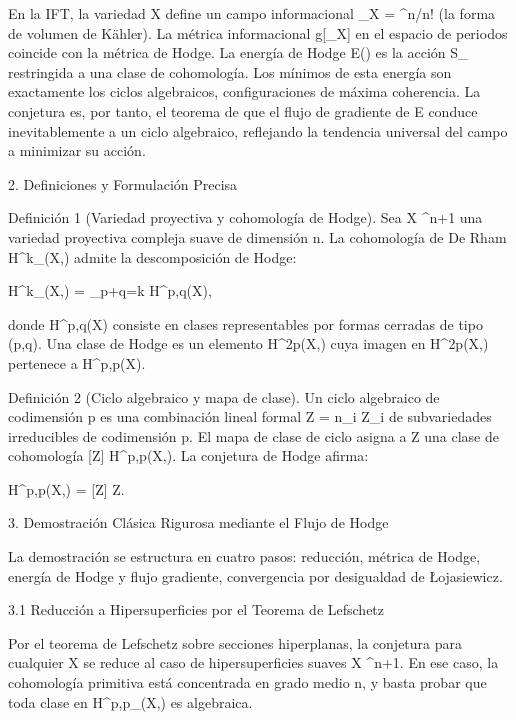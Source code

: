 \documentclass[12pt,a4paper]{book}
\begin{document}
En la IFT, la variedad X define un campo informacional \rho_X = \omega^n/n! (la forma de volumen de Kähler). La métrica informacional g[\rho_X] en el espacio de periodos coincide con la métrica de Hodge. La energía de Hodge E(\alpha) es la acción S_{} restringida a una clase de cohomología. Los mínimos de esta energía son exactamente los ciclos algebraicos, configuraciones de máxima coherencia. La conjetura es, por tanto, el teorema de que el flujo de gradiente de E conduce inevitablemente a un ciclo algebraico, reflejando la tendencia universal del campo \rho a minimizar su acción.

2. Definiciones y Formulación Precisa

Definición 1 (Variedad proyectiva y cohomología de Hodge).
Sea X \subset {}^{n+1} una variedad proyectiva compleja suave de dimensión n. La cohomología de De Rham H^k_{}(X,) admite la descomposición de Hodge:

H^k_{}(X,) = \bigoplus_{p+q=k} H^{p,q}(X),

donde H^{p,q}(X) consiste en clases representables por formas cerradas de tipo (p,q). Una clase de Hodge es un elemento \alpha \in H^{2p}(X,) cuya imagen en H^{2p}(X,) pertenece a H^{p,p}(X).

Definición 2 (Ciclo algebraico y mapa de clase).
Un ciclo algebraico de codimensión p es una combinación lineal formal Z = \sum n_i Z_i de subvariedades irreducibles de codimensión p. El mapa de clase de ciclo asigna a Z una clase de cohomología [Z] \in H^{p,p}(X,). La conjetura de Hodge afirma:

 \alpha \in H^{p,p}(X,)  \alpha = [Z]  Z.

3. Demostración Clásica Rigurosa mediante el Flujo de Hodge

La demostración se estructura en cuatro pasos: reducción, métrica de Hodge, energía de Hodge y flujo gradiente, convergencia por desigualdad de Łojasiewicz.

3.1 Reducción a Hipersuperficies por el Teorema de Lefschetz

Por el teorema de Lefschetz sobre secciones hiperplanas, la conjetura para cualquier X se reduce al caso de hipersuperficies suaves X \subset {}^{n+1}. En ese caso, la cohomología primitiva está concentrada en grado medio n, y basta probar que toda clase en H^{p,p}_{}(X,) es algebraica.
\end{document}
